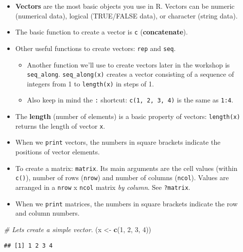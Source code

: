 \documentclass[
]{book}
\newenvironment{Shaded}{\begin{snugshade}}{\end{snugshade}}
\newcommand{\CommentTok}[1]{\textcolor[rgb]{0.56,0.35,0.01}{\textit{#1}}}
\newcommand{\DecValTok}[1]{\textcolor[rgb]{0.00,0.00,0.81}{#1}}
\newcommand{\FunctionTok}[1]{\textcolor[rgb]{0.13,0.29,0.53}{\textbf{#1}}}
\newcommand{\NormalTok}[1]{#1}
\newcommand{\OtherTok}[1]{\textcolor[rgb]{0.56,0.35,0.01}{#1}}
\providecommand{\tightlist}{%
  \setlength{\itemsep}{0pt}\setlength{\parskip}{0pt}}
\begin{document}
\begin{itemize}
\tightlist
\item
  \textbf{Vectors} are the most basic objects you use in R. Vectors can be numeric (numerical data), logical (TRUE/FALSE data), or character (string data).
\item
  The basic function to create a vector is \texttt{c} (\textbf{concatenate}).
\item
  Other useful functions to create vectors: \texttt{rep} and \texttt{seq}.

  \begin{itemize}
  \tightlist
  \item
    Another function we'll use to create vectors later in the workshop is \texttt{seq\_along}. \texttt{seq\_along(x)} creates a vector consisting of a sequence of integers from 1 to \texttt{length(x)} in steps of 1.
  \item
    Also keep in mind the \texttt{:} shortcut: \texttt{c(1,\ 2,\ 3,\ 4)} is the same as \texttt{1:4}.
  \end{itemize}
\item
  The \textbf{length} (number of elements) is a basic property of vectors: \texttt{length(x)} returns the length of vector \texttt{x}.
\item
  When we \texttt{print} vectors, the numbers in square brackets indicate the positions of vector elements.
\item
  To create a matrix: \texttt{matrix}. Its main arguments are the cell values (within \texttt{c()}), number of rows (\texttt{nrow}) and number of columns (\texttt{ncol}). Values are arranged in a \texttt{nrow} x \texttt{ncol} matrix \emph{by column}. See \texttt{?matrix}.
\item
  When we \texttt{print} matrices, the numbers in square brackets indicate the row and column numbers.
\end{itemize}

\begin{Shaded}
\begin{Highlighting}[]
\CommentTok{\# Let\textquotesingle{}s create a simple vector.}
\NormalTok{(x }\OtherTok{\textless{}{-}} \FunctionTok{c}\NormalTok{(}\DecValTok{1}\NormalTok{, }\DecValTok{2}\NormalTok{, }\DecValTok{3}\NormalTok{, }\DecValTok{4}\NormalTok{))}
\end{Highlighting}
\end{Shaded}

\begin{verbatim}
## [1] 1 2 3 4
\end{verbatim}
\end{document}

